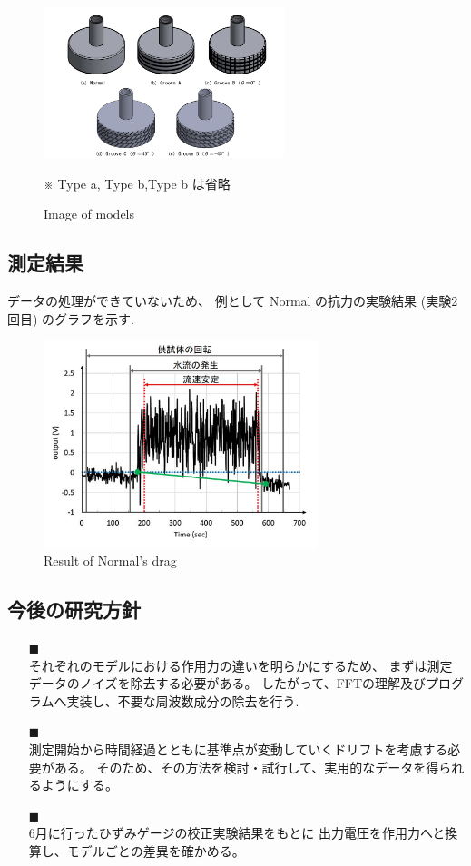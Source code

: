 \documentclass[twocolumn,a4j]{jsarticle}
\begin{document}
\begin{figure}[htbp]
    \footnotesize
    \begin{center}
        \includegraphics[width=70mm]{images/models_1.jpg}
        \caption{Image of models}
        ※ Type a, Type b,Type b は省略
    \end{center}
\end{figure}
\subsection{測定結果}
データの処理ができていないため、
例として Normal の抗力の実験結果 (実験2回目) のグラフを示す.
\begin{figure}[htbp]
    \begin{center}
        \includegraphics[width=80mm]{images/graph.jpg}
        \caption{Result of Normal's drag}
    \end{center}
\end{figure}
\newpage
\subsection{今後の研究方針}
\begin{itemize}
    \item [$\blacksquare$] \\
    それぞれのモデルにおける作用力の違いを明らかにするため、
    まずは測定データのノイズを除去する必要がある。
    したがって、FFTの理解及びプログラムへ実装し、不要な周波数成分の除去を行う.
    \item [$\blacksquare$] \\
    測定開始から時間経過とともに基準点が変動していくドリフトを考慮する必要がある。
    そのため、その方法を検討・試行して、実用的なデータを得られるようにする。
    \item [$\blacksquare$] \\
    6月に行ったひずみゲージの校正実験結果をもとに
    出力電圧を作用力へと換算し、モデルごとの差異を確かめる。
\end{itemize}
\end{document}

